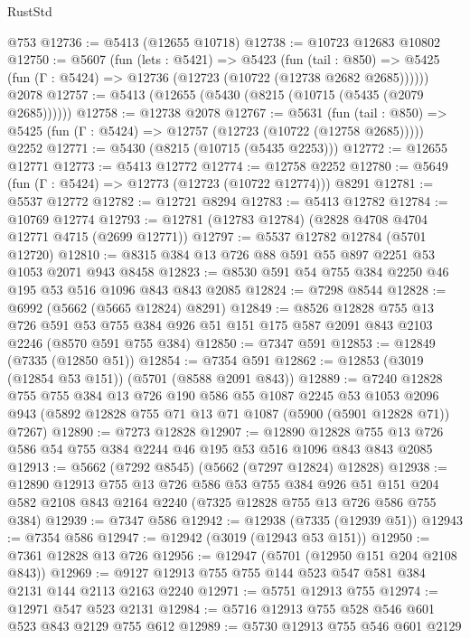 \begin{lexlean}{RustStd}
\begin{coremodule}
    @753
@12736 := @5413 (@12655 @10718)
@12738 := @10723 @12683 @10802
@12750 := @5607
    (fun (lets : @5421) =>
    @5423
      (fun (tail : @850) =>
      @5425 (fun (Γ : @5424) => @12736 (@12723 (@10722 (@12738 @2682 @2685))))))
    @2078
@12757 := @5413 (@12655 (@5430 (@8215 (@10715 (@5435 (@2079 @2685))))))
@12758 := @12738 @2078
@12767 := @5631
    (fun (tail : @850) => @5425 (fun (Γ : @5424) => @12757 (@12723 (@10722 (@12758 @2685)))))
    @2252
@12771 := @5430 (@8215 (@10715 (@5435 @2253)))
@12772 := @12655 @12771
@12773 := @5413 @12772
@12774 := @12758 @2252
@12780 := @5649 (fun (Γ : @5424) => @12773 (@12723 (@10722 @12774))) @8291
@12781 := @5537 @12772
@12782 := @12721 @8294
@12783 := @5413 @12782
@12784 := @10769 @12774
@12793 := @12781 (@12783 @12784) (@2828 @4708 @4704 @12771 @4715 (@2699 @12771))
@12797 := @5537 @12782 @12784 (@5701 @12720)
@12810 := @8315 @384 @13 @726 @88 @591 @55 @897 @2251 @53 @1053 @2071 @943 @8458
@12823 := @8530 @591 @54 @755 @384 @2250 @46 @195 @53 @516 @1096 @843 @843 @2085
@12824 := @7298 @8544
@12828 := @6992 (@5662 (@5665 @12824) @8291)
@12849 := @8526
    @12828
    @755
    @13
    @726
    @591
    @53
    @755
    @384
    @926
    @51
    @151
    @175
    @587
    @2091
    @843
    @2103
    @2246
    (@8570 @591 @755 @384)
@12850 := @7347 @591
@12853 := @12849 (@7335 (@12850 @51))
@12854 := @7354 @591
@12862 := @12853 (@3019 (@12854 @53 @151)) (@5701 (@8588 @2091 @843))
@12889 := @7240
    @12828
    @755
    @755
    @384
    @13
    @726
    @190
    @586
    @55
    @1087
    @2245
    @53
    @1053
    @2096
    @943
    (@5892 @12828 @755 @71 @13 @71 @1087 (@5900 (@5901 @12828 @71)) @7267)
@12890 := @7273 @12828
@12907 := @12890
    @12828
    @755
    @13
    @726
    @586
    @54
    @755
    @384
    @2244
    @46
    @195
    @53
    @516
    @1096
    @843
    @843
    @2085
@12913 := @5662 (@7292 @8545) (@5662 (@7297 @12824) @12828)
@12938 := @12890
    @12913
    @755
    @13
    @726
    @586
    @53
    @755
    @384
    @926
    @51
    @151
    @204
    @582
    @2108
    @843
    @2164
    @2240
    (@7325 @12828 @755 @13 @726 @586 @755 @384)
@12939 := @7347 @586
@12942 := @12938 (@7335 (@12939 @51))
@12943 := @7354 @586
@12947 := @12942 (@3019 (@12943 @53 @151))
@12950 := @7361 @12828 @13 @726
@12956 := @12947 (@5701 (@12950 @151 @204 @2108 @843))
@12969 := @9127 @12913 @755 @755 @144 @523 @547 @581 @384 @2131 @144 @2113 @2163 @2240
@12971 := @5751 @12913 @755
@12974 := @12971 @547 @523 @2131
@12984 := @5716 @12913 @755 @528 @546 @601 @523 @843 @2129 @755 @612
@12989 := @5730 @12913 @755 @546 @601 @2129

\end{coremodule}
\end{lexlean}
